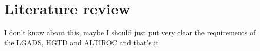 \chapter{Literature review}

I don't know about this, maybe I should just put very clear the requirements of the LGADS, HGTD and ALTIROC and that's it